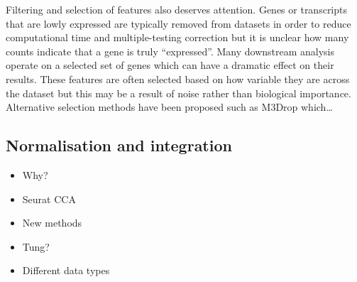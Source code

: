 \documentclass[11pt,a4paper,titlepage,twoside,openright]{style/unimelbthesis}
\theoremstyle{definition}
\theoremstyle{definition}
\theoremstyle{definition}
\theoremstyle{remark}
\begin{document}
\begin{mainmatter}
Filtering and selection of features also deserves attention. Genes or transcripts that are lowly expressed are typically removed from datasets in order to reduce computational time and multiple-testing correction but it is unclear how many counts indicate that a gene is truly ``expressed''. Many downstream analysis operate on a selected set of genes which can have a dramatic effect on their results. These features are often selected based on how variable they are across the dataset but this may be a result of noise rather than biological importance. Alternative selection methods have been proposed such as M3Drop which\ldots{}

\hypertarget{normalisation-and-integration}{%
\subsection{Normalisation and integration}\label{normalisation-and-integration}}

\begin{itemize}
\tightlist
\item
  Why?
\item
  Seurat CCA
\item
  New methods
\item
  Tung?
\item
  Different data types
\end{itemize}


\end{mainmatter}
\end{document}
